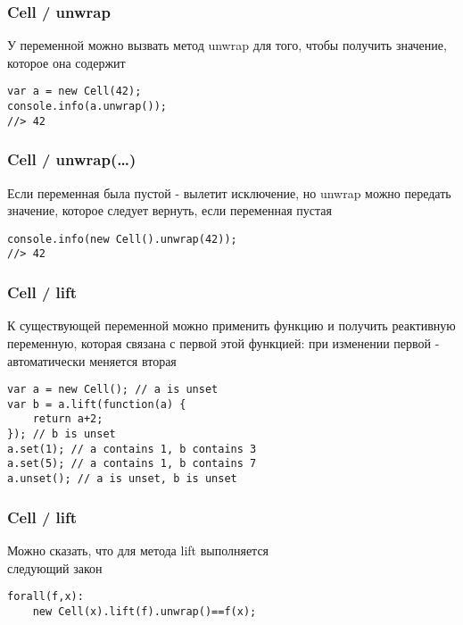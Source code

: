 \documentclass[xetex]{beamer}
\begin{document}
\begin{frame}[fragile]
\frametitle{Cell / unwrap}
У переменной можно вызвать метод unwrap для того, чтобы получить значение, которое она содержит

\vspace{10mm}

\begin{lstlisting}
var a = new Cell(42);
console.info(a.unwrap());
//> 42
\end{lstlisting}
\end{frame}


\begin{frame}[fragile]
\frametitle{Cell / unwrap(\dots)}
Если переменная была пустой - вылетит исключение, но unwrap можно передать значение, которое следует вернуть, если переменная пустая

\vspace{10mm}

\lstset{
  xleftmargin=.1\textwidth, xrightmargin=.1\textwidth
}
\begin{lstlisting}
console.info(new Cell().unwrap(42));
//> 42
\end{lstlisting}
\end{frame}

\lstset{
  xleftmargin=.05\textwidth, xrightmargin=.05\textwidth
}

\begin{frame}[fragile]
\frametitle{Cell / lift}
К существующей переменной можно применить функцию и получить реактивную переменную, которая связана с первой этой функцией: при изменении первой - автоматически меняется вторая

\vspace{4mm}
\begin{lstlisting}
var a = new Cell(); // a is unset
var b = a.lift(function(a) { 
    return a+2; 
}); // b is unset
a.set(1); // a contains 1, b contains 3
a.set(5); // a contains 1, b contains 7
a.unset(); // a is unset, b is unset
\end{lstlisting}
\end{frame}


\begin{frame}[fragile]
\frametitle{Cell / lift}
Можно сказать, что для метода lift выполняется\\ следующий закон

\vspace{10mm}

\begin{lstlisting}
forall(f,x):
    new Cell(x).lift(f).unwrap()==f(x);
\end{lstlisting}
\end{frame}
\end{document}
